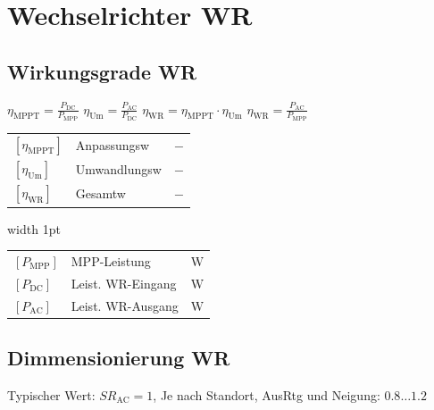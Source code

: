 \columnbreak
\section{Wechselrichter WR}
\subsection{Wirkungsgrade WR}

$
\boxed{
\eta_\text{MPPT} = \frac{P_\text{DC}}{P_\text{MPP}}
}$
$
\boxed{
\eta_\text{Um} = \frac{P_\text{AC}}{P_\text{DC}}
}$
$
\boxed{
\eta_\text{WR} = \eta_\text{MPPT} \cdot \eta_\text{Um}
}$
$
\boxed{
\eta_\text{WR} = \frac{P_\text{AC}}{P_\text{MPP}}
}
$

\vspace{0.1cm}

\begin{minipage}[t]{0.48\columnwidth}
    \renewcommand{\arraystretch}{1.2}
    \begin{tabular}{@{} l p{2.8cm} l @{}}
        $[\eta_\text{MPPT}]$ & Anpassungsw \dotfill & $\mathrm{-}$ \\
        $[\eta_\text{Um}]$   & Umwandlungsw \dotfill   & $\mathrm{-}$ \\
        $[\eta_\text{WR}]$   & Gesamtw \dotfill & $\mathrm{-}$ \\
    \end{tabular}
\end{minipage}
\hfill
\vrule width 1pt
\hfill
\begin{minipage}[t]{0.48\columnwidth}
    \renewcommand{\arraystretch}{1.2}
    \begin{tabular}{@{} l p{2.8cm} l @{}}
        $[P_\text{MPP}]$     & MPP-Leistung \dotfill     & $\mathrm{W}$ \\
        $[P_\text{DC}]$      & Leist. WR-Eingang \dotfill   & $\mathrm{W}$ \\
        $[P_\text{AC}]$      & Leist. WR-Ausgang \dotfill  & $\mathrm{W}$ \\
    \end{tabular}
\end{minipage}

\subsection{Dimmensionierung WR}

Typischer Wert: $SR_{\mathrm{AC}} = 1$, \quad Je nach Standort, AusRtg und Neigung: $ 0.8 \ldots 1.2$

\vspace{0.1cm}


